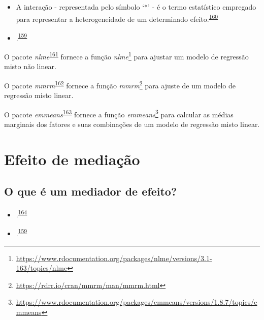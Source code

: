 \documentclass[
  a4paper,
]{book}
\renewcommand{\href}[2]{#2\footnote{\url{#1}}}
\newenvironment{infobox}[1]
  {
  \begin{itemize}
  \renewcommand{\labelitemi}{
    \raisebox{-.7\height}[0pt][0pt]{
      {\setkeys{Gin}{width=3em,keepaspectratio}
        \texttt{[image: \#1]}}
    }
  }
  \setlength{\fboxsep}{1em}
  \begin{blackbox}
  \item
  }
  {
  \end{blackbox}
  \end{itemize}
  }
\begin{document}
\begin{itemize}
\item
  A interação - representada pelo símbolo `*' - é o termo estatístico empregado para representar a heterogeneidade de um determinado efeito.\textsuperscript{\protect\hyperlink{ref-Altman1996}{160}}
\item
  .\textsuperscript{\protect\hyperlink{ref-Bours2023}{159}}
\end{itemize}

\begin{infobox}{images/Rlogo}
O pacote \emph{nlme}\textsuperscript{\protect\hyperlink{ref-nlme}{161}} fornece a função \href{https://www.rdocumentation.org/packages/nlme/versions/3.1-163/topics/nlme}{\emph{nlme}} para ajustar um modelo de regressão misto não linear.

\end{infobox}

\begin{infobox}{images/Rlogo}
O pacote \emph{mmrm}\textsuperscript{\protect\hyperlink{ref-mmrm}{162}} fornece a função \href{https://rdrr.io/cran/mmrm/man/mmrm.html}{\emph{mmrm}} para ajuste de um modelo de regressão misto linear.

\end{infobox}

\begin{infobox}{images/Rlogo}
O pacote \emph{emmeans}\textsuperscript{\protect\hyperlink{ref-emmeans}{163}} fornece a função \href{https://www.rdocumentation.org/packages/emmeans/versions/1.8.7/topics/emmeans}{\emph{emmeans}} para calcular as médias marginais dos fatores e suas combinações de um modelo de regressão misto linear.

\end{infobox}

\hypertarget{mediacao}{%
\section{Efeito de mediação}\label{mediacao}}

\hypertarget{o-que-uxe9-um-mediador-de-efeito}{%
\subsection{O que é um mediador de efeito?}\label{o-que-uxe9-um-mediador-de-efeito}}

\begin{itemize}
\item
  .\textsuperscript{\protect\hyperlink{ref-Baron1986}{164}}
\item
  .\textsuperscript{\protect\hyperlink{ref-Bours2023}{159}}
\end{itemize}
\end{document}
